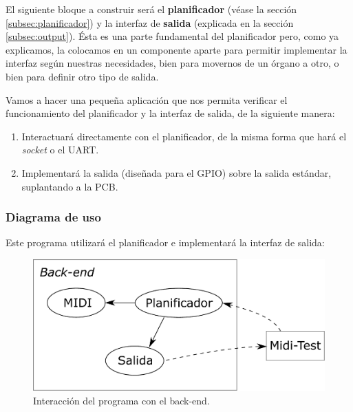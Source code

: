 El siguiente bloque a construir será el \textbf{planificador} (véase la sección \ref{subsec:planificador}) y la interfaz de \textbf{salida} (explicada en la sección \ref{subsec:output}). Ésta es una parte fundamental del planificador pero, como ya explicamos, la colocamos en un componente aparte para permitir implementar la interfaz según nuestras necesidades, bien para movernos de un órgano a otro, o bien para definir otro tipo de salida.

Vamos a hacer una pequeña aplicación que nos permita verificar el funcionamiento del planificador y la interfaz de salida, de la siguiente manera:

\begin{enumerate}
	\item Interactuará directamente con el planificador, de la misma forma que hará el \textit{socket} o el \acrshort{UART}.
	\item Implementará la salida (diseñada para el \acrshort{GPIO}) sobre la salida estándar, suplantando a la \acrshort{PCB}.
\end{enumerate}

\subsubsection{Diagrama de uso}

Este programa utilizará el planificador e implementará la interfaz de salida:

\smallskip

\begin{figure}[H]
	\noindent \begin{centering}
		\includegraphics[width=\linewidth/2]{capitulo4/midi_test}
		\par\end{centering}
	\smallskip
	\caption{\label{fig:midi_test} Interacción del programa con el back-end.}
\end{figure} 

